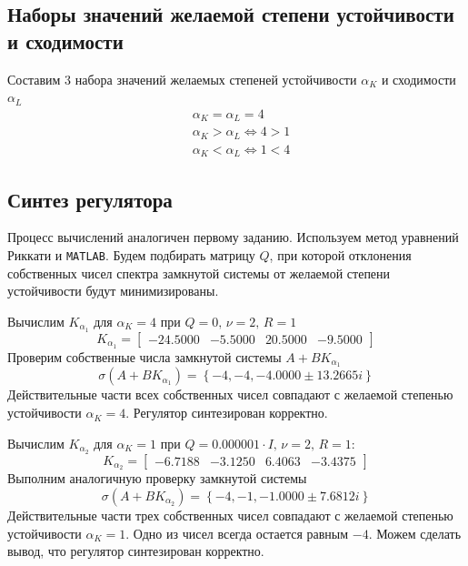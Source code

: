 \documentclass[a4paper, 12pt]{article}
\begin{document}
    \subsection{Наборы значений желаемой степени устойчивости и сходимости}
    Составим 3 набора значений желаемых степеней устойчивости $\alpha_K$ и сходимости $\alpha_L$
    \begin{align*}
        &\alpha_K=\alpha_L=4\\
        &\alpha_K>\alpha_L\Leftrightarrow 4>1\\
        &\alpha_K<\alpha_L\Leftrightarrow 1<4
    \end{align*}


    \subsection{Синтез регулятора}
    Процесс вычислений аналогичен первому заданию. Используем метод уравнений Риккати и \texttt{MATLAB}.
    Будем подбирать матрицу $Q$, при которой отклонения собственных чисел спектра замкнутой системы
    от желаемой степени устойчивости будут минимизированы.


    Вычислим $K_{\alpha_1}$ для $\alpha_K=4$ при $Q=0,\,\nu=2,\,R=1$
    $$
    K_{\alpha_1}=
    \begin{bmatrix}
        -24.5000   &-5.5000   &20.5000   &-9.5000
    \end{bmatrix}
    $$
    Проверим собственные числа замкнутой системы $A+BK_{\alpha_1}$
    $$
    \sigma\left( A+BK_{\alpha_1} \right)=\left\{ -4,-4,-4.0000\pm13.2665i \right\}
    $$
    Действительные части всех собственных чисел совпадают с желаемой степенью устойчивости $\alpha_K=4$.
    Регулятор синтезирован корректно.


    Вычислим $K_{\alpha_2}$ для $\alpha_K=1$ при $Q=0.000001\cdot I,\,\nu=2,\,R=1$:
    $$
    K_{\alpha_2}=
    \begin{bmatrix}
        -6.7188   &-3.1250    &6.4063   &-3.4375
    \end{bmatrix}
    $$
    Выполним аналогичную проверку замкнутой системы
    $$
    \sigma\left( A+BK_{\alpha_2} \right)=\left\{ -4,-1,-1.0000 \pm 7.6812i \right\}
    $$
    Действительные части трех собственных чисел совпадают с желаемой степенью устойчивости $\alpha_K=1$.
    Одно из чисел всегда остается равным $-4$. Можем сделать вывод, что регулятор синтезирован корректно.
\end{document}
